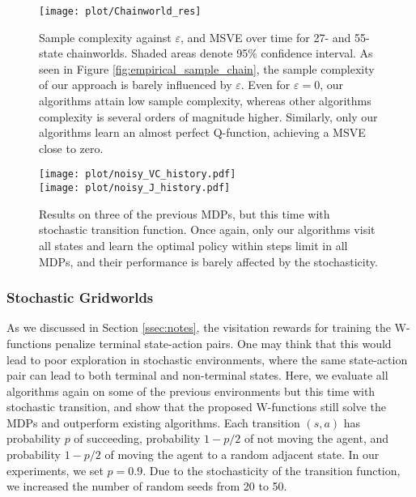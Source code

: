 \documentclass{article}
\begin{document}
\begin{figure}[t]
	\centering
	\texttt{[image: plot/Chainworld\_res]}
	\caption{\label{fig:chain_res} Sample complexity against $\varepsilon$, and MSVE over time for 27- and 55-state chainworlds. Shaded areas denote 95\% confidence interval. As seen in Figure \ref{fig:empirical_sample_chain}, the sample complexity of our approach is barely influenced by $\varepsilon$. Even for $\varepsilon = 0$, our algorithms attain low sample complexity, whereas other algorithms complexity is several orders of magnitude higher. Similarly, only our algorithms learn an almost perfect Q-function, achieving a MSVE close to zero.}
\end{figure}

\clearpage




\begin{figure}[t]
	\centering
	\texttt{[image: plot/noisy\_VC\_history.pdf]}
	\\
	\texttt{[image: plot/noisy\_J\_history.pdf]}	\caption{\label{fig:noisy_res}Results on three of the previous MDPs, but this time with stochastic transition function. Once again, only our algorithms visit all states and learn the optimal policy within steps limit in all MDPs, and their performance is barely affected by the stochasticity.}
\end{figure}

\subsubsection{Stochastic Gridworlds}
\label{sssec:stochastic_grid}
As we discussed in Section \ref{ssec:notes}, the visitation rewards for training the W-functions penalize terminal state-action pairs. One may think that this would lead to poor exploration in stochastic environments, where the same state-action pair can lead to both terminal and non-terminal states. 
Here, we evaluate all algorithms again on some of the previous environments but this time with stochastic transition, and show that the proposed W-functions still solve the MDPs and outperform existing algorithms. 
Each transition $(s,a)$ has probability $p$ of succeeding, probability $1 - p/2$ of not moving the agent, and probability $1 - p/2$ of moving the agent to a random adjacent state. In our experiments, we set $p = 0.9$.  
Due to the stochasticity of the transition function, we increased the number of random seeds from 20 to 50.
\end{document}

